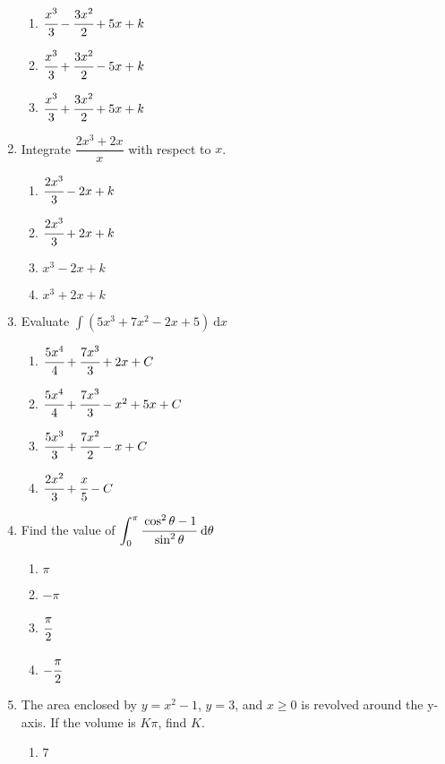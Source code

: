 \begin{multicols}{2}
\begin{enumerate}[label={\arabic*.}]
\begin{enumerate}[label={\Alph*.}]
        \item \({\cfrac{{x}^{3}}{3}} - {\cfrac{3{x}^{2}}{2}} + 5x + k \)
        \item \({\cfrac{{x}^{3}}{3}} + {\cfrac{3{x}^{2}}{2}} - 5x + k \)
        \item \({\cfrac{{x}^{3}}{3}} + {\cfrac{3{x}^{2}}{2}} + 5x + k \)
      \end{enumerate}
    \item Integrate \(\dfrac{2x^3+2x}{x}\) with respect to \(x\).
      \begin{enumerate}[label={\Alph*.}]
        \item \({\cfrac{2{x}^{3}}{3}} - 2x + k \)
        \item \({\cfrac{2{x}^{3}}{3}} + 2x + k \)
        \item \({x}^{3} - 2x + k \)
        \item \({x}^{3} + 2x + k \)
      \end{enumerate}
    \item Evaluate \(\displaystyle \int \left(5{x}^{3} + 7{x}^{2} -2x + 5\right)\ \mathrm{d}x\)
      \begin{enumerate}[label={\Alph*.}]
        \item \({\cfrac{5{x}^{4}}{4}} + {\cfrac{7{x}^{3}}{3}} + 2x + C \)
        \item \({\cfrac{5{x}^{4}}{4}} + {\cfrac{7{x}^{3}}{3}} - {x}^{2} + 5x + C \)
        \item \({\cfrac{5{x}^{3}}{3}} + {\cfrac{7{x}^{2}}{2}} - {x} + C \)
        \item \({\cfrac{2{x}^{2}}{3}} + {\cfrac{x}{5}} - C \)
      \end{enumerate}
    \item Find the value of \(\displaystyle \int^{\pi}_{0}\cfrac{\cos^{2}\theta-1}{\sin^{2}\theta}\ \mathrm{d}\theta\)
      \begin{enumerate}[label={\Alph*.}]
        \item \(\pi\)
        \item \(-\pi\)
        \item \(\cfrac{\pi}{2}\)
        \item \(-{\cfrac{\pi}{2}}\)
      \end{enumerate}
    \item The area enclosed by \(y=x^2-1\), \(y=3\), and \(x \ge 0\) is revolved around the y-axis. If the volume is \(K\pi\), find \(K\).
      \begin{enumerate}[label={\Alph*.}]
        \item \(7\)

\end{enumerate}
\end{enumerate}
\end{multicols}
